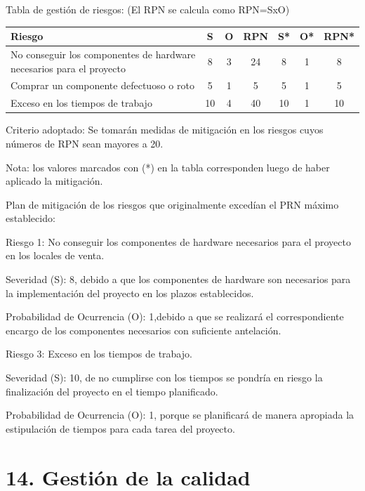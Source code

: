 \documentclass[
11pt, %
]{charter}
\begin{document}
Tabla de gestión de riesgos:      (El RPN se calcula como RPN=SxO)

\begin{table}[htpb]
\centering
\begin{tabularx}{\linewidth}{@{}|X|c|c|c|c|c|c|@{}}
\hline
\rowcolor[HTML]{C0C0C0} 
Riesgo & S & O & RPN & S* & O* & RPN* \\ \hline
No conseguir los componentes de hardware necesarios  para el proyecto       & 8  & 3  &  24   & 8  &  1  &  8      \\ \hline
Comprar un componente defectuoso o roto       & 5  & 1  &  5   &  5  & 1  &  5    \\ \hline
Exceso en los tiempos de trabajo       & 10  & 4  &  40   &   10 &  1 & 10     \\ \hline
\end{tabularx}%
\end{table}

Criterio adoptado: 
Se tomarán medidas de mitigación en los riesgos cuyos números de RPN sean mayores a 20.

Nota: los valores marcados con (*) en la tabla corresponden luego de haber aplicado la mitigación.


Plan de mitigación de los riesgos que originalmente excedían el PRN máximo establecido:
 
Riesgo 1: No conseguir los componentes de hardware necesarios  para el proyecto en los locales de venta.


Severidad (S): 8, debido a que los componentes de hardware son necesarios para la implementación del proyecto en los plazos establecidos.  

Probabilidad de Ocurrencia (O):  1,debido a que  se realizará el correspondiente encargo de los componentes necesarios con suficiente antelación.
 
Riesgo 3: Exceso en los tiempos de trabajo.

Severidad (S): 10, de no cumplirse con los tiempos se pondría en riesgo la finalización del proyecto en el tiempo planificado.

Probabilidad de Ocurrencia (O): 1, porque se planificará de manera apropiada la estipulación de tiempos para cada tarea  del proyecto.



\section{14. Gestión de la calidad}
\label{sec:calidad}
\end{document}
